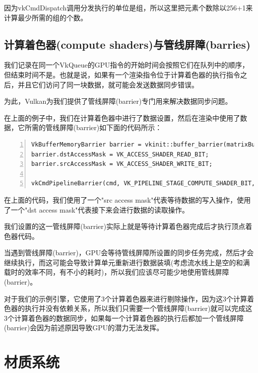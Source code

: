\documentclass{ctexart}
\begin{document}
因为vkCmdDispatch调用分发执行的单位是组，所以这里把元素个数除以256+1来计算最少所需的组的个数。

\subsection{计算着色器(compute shaders)与管线屏障(barries)}

我们记录在同一个VkQueue的GPU指令的开始时间会按照它们在队列中的顺序，但结束时间不是。也就是说，如果有一个渲染指令位于计算着色器的执行指令之后，并且它们访问了同一块数据，就可能会发送数据同步错误。

为此，Vulkan为我们提供了管线屏障(barrier)专门用来解决数据同步问题。

在上面的例子中，我们在计算着色器中进行了数据设置，然后在渲染中使用了数据，它所需的管线屏障(barrier)如下面的代码所示：

\begin{lstlisting}[language={[ANSI]C},keywordstyle=\color{blue!70},commentstyle=\color{red!50!green!50!blue!50},frame=shadowbox, rulesepcolor=\color{red!20!green!20!blue!20},basicstyle=\small,numbers=left, numberstyle=\tiny,breaklines=true]
VkBufferMemoryBarrier barrier = vkinit::buffer_barrier(matrixBuffer, _graphicsQueueFamily);
barrier.dstAccessMask = VK_ACCESS_SHADER_READ_BIT;
barrier.srcAccessMask = VK_ACCESS_SHADER_WRITE_BIT;

vkCmdPipelineBarrier(cmd, VK_PIPELINE_STAGE_COMPUTE_SHADER_BIT, VK_PIPELINE_STAGE_VERTEX_SHADER_BIT, 0, 0, nullptr, 1, &barrier, 0, nullptr);
\end{lstlisting}

在上面的代码，我们使用了一个"src access mask"代表等待数据的写入操作，使用了一个"dst access mask"代表接下来会进行数据的读取操作。

我们设置的这一管线屏障(barrier)实际上就是等待计算着色器完成后才执行顶点着色器代码。

当遇到管线屏障(barrier)，GPU会等待管线屏障所设置的同步任务完成，然后才会继续执行，而这可能会导致计算单元重新进行数据装填(考虑流水线上是空的和满载时的效率不同，有不小的耗时)，所以我们应该尽可能少地使用管线屏障(barrier)。

对于我们的示例引擎，它使用了3个计算着色器来进行剔除操作，因为这3个计算着色器的执行并没有依赖关系，所以我们只需要一个管线屏障(barrier)就可以完成这3个计算着色器的数据同步，如果每一个计算着色器的执行后都加一个管线屏障(barrier)会因为前述原因导致GPU的潜力无法发挥。

\newpage
\section{材质系统}
\end{document}
